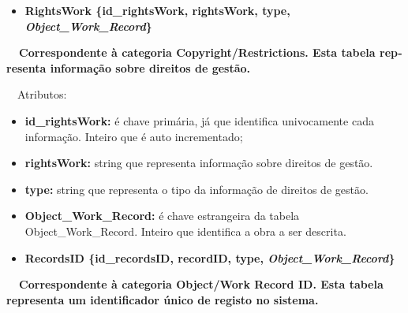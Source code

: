 \documentclass[letterpaper]{article}
\newcommand\textstyleStrongEmphasis[1]{\textbf{#1}}
\newcommand\liststyleLi{%
\renewcommand\labelitemi{{\textbullet}}
\renewcommand\labelitemii{[27A2?]}
\renewcommand\labelitemiii{{\textbullet}}
\renewcommand\labelitemiv{{\textbullet}}
}
\newcommand\liststyleLvi{%
\renewcommand\labelitemi{[27A2?]}
\renewcommand\labelitemii{[27A2?]}
\renewcommand\labelitemiii{[27A2?]}
\renewcommand\labelitemiv{[27A2?]}
}
\begin{document}
\bigskip

\liststyleLi
\begin{itemize}
\item {\bfseries
RightsWork\textmd{ \{}\textmd{id\_rightsWork}\textmd{, rightsWork, type,
}\textmd{\textit{Object\_Work\_Record}}\textmd{\}}}
\end{itemize}
{\bfseries
\foreignlanguage{english}{\textmd{\ \ Correspondente \`a categoria
}}\textstyleStrongEmphasis{\foreignlanguage{english}{Copyright/Restrictions}}\textstyleStrongEmphasis{\foreignlanguage{english}{\textmd{.
}}}\foreignlanguage{english}{\textmd{Esta
}}\textstyleStrongEmphasis{\foreignlanguage{english}{\textmd{tabela}}}\foreignlanguage{english}{\textmd{
representa informa\c{c}\~ao sobre direitos de gest\~ao.}}}


\bigskip

{
\ \ Atributos:}

\liststyleLvi
\begin{itemize}
\item {
\textbf{id\_}\textbf{rightsWork}\textbf{:} \'e chave prim\'aria, j\'a
que identifica univocamente cada informa\c{c}\~ao. Inteiro que \'e auto
incrementado;}
\item {
\textbf{rightsWork:} string que representa informa\c{c}\~ao sobre
direitos de gest\~ao.}
\item {
\textbf{type:} string que representa o tipo da informa\c{c}\~ao de
direitos de gest\~ao.}
\item {
\textbf{Object\_Work\_Record:}\textit{ }\'e chave estrangeira da tabela
Object\_Work\_Record. Inteiro que identifica a obra a ser descrita.}
\end{itemize}

\bigskip

\liststyleLi
\begin{itemize}
\item {\bfseries
RecordsID\textmd{ \{}\textmd{id\_recordsID}\textmd{, recordID, type,
}\textmd{\textit{Object\_Work\_Record}}\textmd{\}}}
\end{itemize}
{\bfseries
\foreignlanguage{english}{\textmd{\ \ Correspondente \`a categoria
}}\foreignlanguage{english}{Object}\textstyleStrongEmphasis{\foreignlanguage{english}{/Work
Record ID}}\textstyleStrongEmphasis{\foreignlanguage{english}{\textmd{.
}}}\foreignlanguage{english}{\textmd{Esta
}}\textstyleStrongEmphasis{\foreignlanguage{english}{\textmd{tabela}}}\foreignlanguage{english}{\textmd{
representa um identificador \'unico de registo no sistema.}}}
\end{document}
